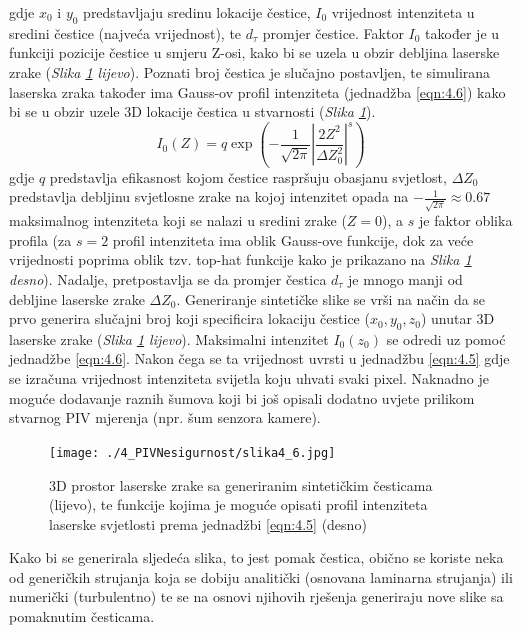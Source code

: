 gdje $x_{0}$ i $y_{0}$ predstavljaju sredinu lokacije čestice, $I_{0}$ vrijednost intenziteta u sredini čestice (najveća vrijednost), te $d_{\tau}$ promjer čestice. Faktor $I_{0}$ također je u funkciji pozicije čestice u smjeru Z-osi, kako bi se uzela u obzir debljina laserske zrake (\textit{Slika \ref{sl:4.6} lijevo}). Poznati broj čestica je slučajno postavljen, te simulirana laserska zraka također ima Gauss-ov profil intenziteta (jednadžba \ref{eqn:4.6}) kako bi se u obzir uzele 3D lokacije čestica u stvarnosti (\textit{Slika \ref{sl:4.6}}). 
\begin{equation}
	I_{0}(Z)=q\exp \left( -\frac{1}{\sqrt{2\pi}} \left|\frac{2Z^{2}}{\Delta Z_{0}^{2}}\right|^{s} \right)
	\label{eqn:4.6}
\end{equation}
gdje $q$ predstavlja efikasnost kojom čestice raspršuju obasjanu svjetlost, $\Delta Z_{0}$ predstavlja debljinu svjetlosne zrake na kojoj intenzitet opada na $-\frac{1}{\sqrt{2\pi}}\approx0.67$ maksimalnog intenziteta koji se nalazi u sredini zrake ($Z=0$), a $s$ je faktor oblika profila (za $s=2$ profil intenziteta ima oblik Gauss-ove funkcije, dok za veće vrijednosti poprima oblik tzv. top-hat funkcije kako je prikazano na \textit{Slika \ref{sl:4.6} desno}). Nadalje, pretpostavlja se da promjer čestica $d_{\tau}$ je mnogo manji od debljine laserske zrake $\Delta Z_{0}$. Generiranje sintetičke slike se vrši na način da se prvo generira slučajni broj koji specificira lokaciju čestice ($x_{0}, y_{0}, z_{0}$) unutar 3D laserske zrake (\textit{Slika \ref{sl:4.6} lijevo}). Maksimalni intenzitet $I_{0}(z_{0})$ se odredi uz pomoć jednadžbe \ref{eqn:4.6}. Nakon čega se ta vrijednost uvrsti u jednadžbu \ref{eqn:4.5} gdje se izračuna vrijednost intenziteta svijetla koju uhvati svaki pixel. Naknadno je moguće dodavanje raznih šumova koji bi još opisali dodatno uvjete prilikom stvarnog PIV mjerenja (npr. šum senzora kamere).
\begin{figure}[h]  
	\centering
	\texttt{[image: ./4\_PIVNesigurnost/slika4\_6.jpg]} 
	\caption{3D prostor laserske zrake sa generiranim sintetičkim česticama (lijevo), te funkcije kojima je moguće opisati profil intenziteta laserske svjetlosti prema jednadžbi \ref{eqn:4.5} (desno)\cite{raffel2018_book}}
	\label{sl:4.6}
\end{figure}
\par
Kako bi se generirala sljedeća slika, to jest pomak čestica, obično se koriste neka od generičkih strujanja koja se dobiju analitički (osnovana laminarna strujanja) ili numerički (turbulentno) te se na osnovi njihovih rješenja generiraju nove slike sa pomaknutim česticama.
\FloatBarrier
